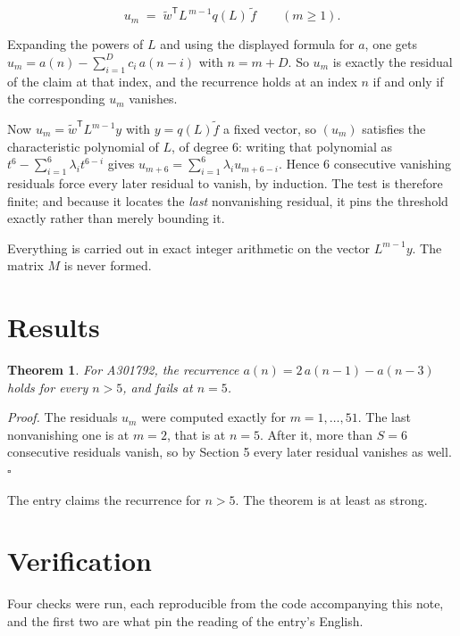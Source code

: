 \documentclass[11pt]{article}
\newtheorem{theorem}{Theorem}
\theoremstyle{definition}
\begin{document}
\[u_m \;=\; \tilde w^{\mathsf T} L^{\,m-1} q(L)\,\tilde f \qquad (m \ge 1).\]

Expanding the powers of $L$ and using the displayed formula for $a$, one gets $u_m = a(n) - \sum_{i=1}^{D} c_i\,a(n-i)$ with $n = m + D$. So $u_m$ is exactly the residual of the claim at that index, and the recurrence holds at an index $n$ if and only if the corresponding $u_m$ vanishes.

Now $u_m = \tilde w^{\mathsf T} L^{m-1} y$ with $y = q(L)\tilde f$ a fixed vector, so $(u_m)$ satisfies the characteristic polynomial of $L$, of degree $6$: writing that polynomial as $t^{6} - \sum_{i=1}^{6} \lambda_i t^{6-i}$ gives $u_{m+6} = \sum_{i=1}^{6} \lambda_i u_{m+6-i}$. Hence $6$ consecutive vanishing residuals force every later residual to vanish, by induction. The test is therefore finite; and because it locates the {\itshape last} nonvanishing residual, it pins the threshold exactly rather than merely bounding it.

Everything is carried out in exact integer arithmetic on the vector $L^{m-1}y$. The matrix $M$ is never formed.

\section{Results}

\begin{theorem} For A301792, the recurrence $a(n) = 2\,a(n-1) - a(n-3)$ holds for every $n > 5$, and fails at $n = 5$.\end{theorem}

{\itshape Proof.} The residuals $u_m$ were computed exactly for $m = 1,\dots,51$. The last nonvanishing one is at $m = 2$, that is at $n = 5$. After it, more than $S = 6$ consecutive residuals vanish, so by Section 5 every later residual vanishes as well. $\square$

The entry claims the recurrence for $n > 5$. The theorem is at least as strong.

\section{Verification}

Four checks were run, each reproducible from the code accompanying this note, and the first two are what pin the reading of the entry's English.
\end{document}
